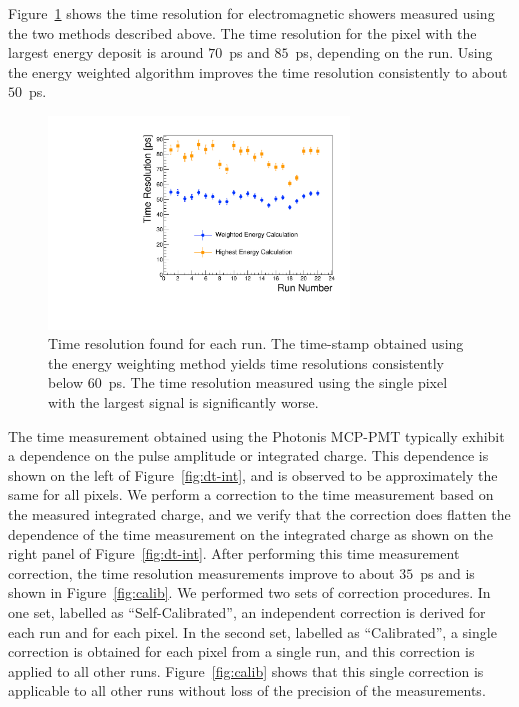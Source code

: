 Figure~\ref{fig:wtres} shows the time resolution for electromagnetic
showers measured using the two methods described above. The time resolution for
the pixel with the largest energy deposit is around $70$~ps and $85$~ps,
depending on the run. Using the energy weighted algorithm improves the time
resolution consistently to about $50$~ps. 
\begin{figure}[h] 
\centering
\includegraphics[width=8cm]{Images/wtres/tresperrun.pdf} 
\caption{\small Time resolution found for each run. The time-stamp obtained using the energy weighting method yields time resolutions consistently below $60$~ps. The time resolution measured using the single pixel with the largest signal is significantly worse.} 
\label{fig:wtres} 
\end{figure} 
The time measurement obtained using the Photonis MCP-PMT typically exhibit
a dependence on the pulse amplitude or integrated charge. This dependence is
shown on the left of Figure~\ref{fig:dt-int}, and is observed to be
approximately the same for all pixels. We perform a correction to the time
measurement based on the measured integrated charge, and we verify that the
correction does flatten the dependence of the time measurement on the integrated
charge as shown on the right panel of Figure~\ref{fig:dt-int}. After performing
this time measurement correction, the time resolution measurements improve to
about $35$~ps and is shown in Figure~\ref{fig:calib}. We performed two sets of
correction procedures. In one set, labelled as ``Self-Calibrated'', an
independent correction is derived for each run and for each pixel. In the second
set, labelled as ``Calibrated'', a single correction is obtained for each pixel
from a single run, and this correction is applied to all other runs.
Figure~\ref{fig:calib} shows that this single correction is applicable to all
other runs without loss of the precision of the measurements. 

